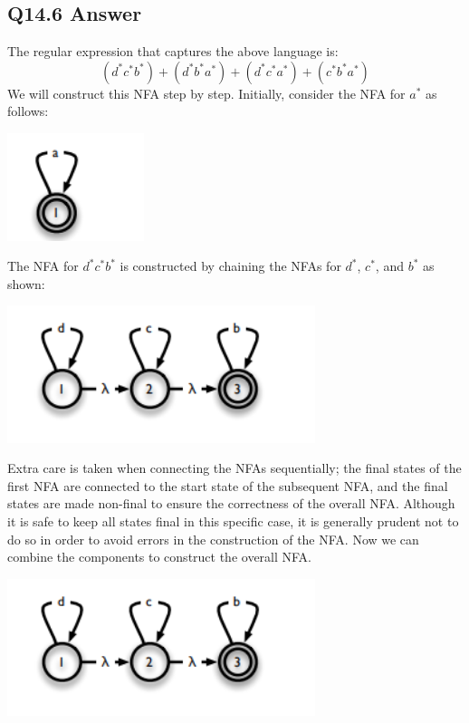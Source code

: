 \documentclass{article}
\begin{document}
\subsection*{Q14.6 Answer}
The regular expression that captures the above language is:
\[(d^*c^*b^*)+(d^*b^*a^*)+(d^*c^*a^*)+(c^*b^*a^*)\]
We will construct this NFA step by step. Initially, consider the NFA for \( a^* \) as follows:
\begin{center}
    \includegraphics[width=4cm]{10.png}
\end{center}
The NFA for \( d^*c^*b^* \) is constructed by chaining the NFAs for \( d^* \), \( c^* \), and \( b^* \) as shown:
\begin{center}
    \includegraphics[width=9cm]{11.png}
\end{center}
Extra care is taken when connecting the NFAs sequentially; the final states of the first NFA are connected to the start state of the subsequent NFA, and the final states are made non-final to ensure the correctness of the overall NFA. Although it is safe to keep all states final in this specific case, it is generally prudent not to do so in order to avoid errors in the construction of the NFA.
Now we can combine the components to construct the overall NFA.
\begin{center}
    \includegraphics[width=9cm]{11.png}
\end{center}
\newpage
\end{document}
